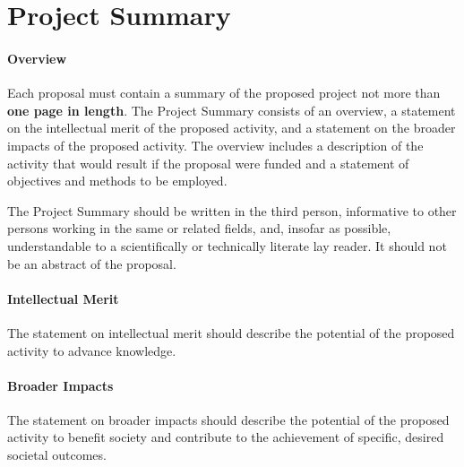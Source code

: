\section*{Project Summary}

\paragraph*{Overview}
Each proposal must contain a summary of the proposed project not more than {\bf one page in length}. The Project
Summary consists of an overview, a statement on the intellectual merit of the proposed activity, and a statement
on the broader impacts of the proposed activity.
The overview includes a description of the activity that would result if the proposal were funded and a statement
of objectives and methods to be employed.

The Project Summary should be written in the third person, informative to other persons working in
the same or related fields, and, insofar as possible, understandable to a scientifically or technically
literate lay reader. It should not be an abstract of the proposal.


\paragraph*{Intellectual Merit}
The statement on intellectual merit should describe the potential of the proposed activity to advance knowledge.

\paragraph*{Broader Impacts}
The statement on broader impacts should describe the potential of the proposed activity to benefit society and contribute to the achievement of specific, desired societal outcomes.
